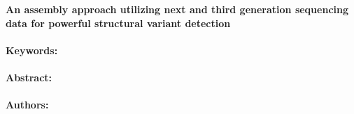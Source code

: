 \noindent
\large {\bf An assembly approach utilizing next and third generation sequencing data for powerful structural variant detection} 


\normalsize 


\noindent \paragraph{Keywords:} 

\noindent \paragraph{Abstract:} 



\noindent \paragraph{Authors:} 

